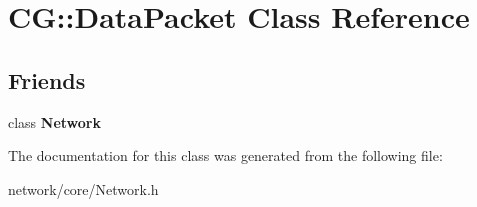 \hypertarget{class_c_g_1_1_data_packet}{}\section{CG\+:\+:Data\+Packet Class Reference}
\label{class_c_g_1_1_data_packet}
\subsection*{Friends}
\begin{DoxyCompactItemize}
\item 
\mbox{\label{class_c_g_1_1_data_packet_a88b59289ffd793fecd040d32e397b1e9}} 
class {\bfseries Network}
\end{DoxyCompactItemize}


The documentation for this class was generated from the following file\+:\begin{DoxyCompactItemize}
\item 
network/core/Network.\+h\end{DoxyCompactItemize}

